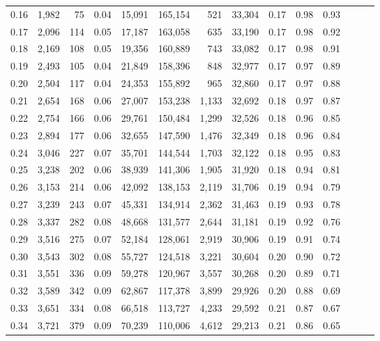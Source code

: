 \begin{tabular}{rrrrrrrrrrrrrr}
0.16 &  1,982 &   75 &  0.04 &   15,091 &  165,154 &     521 &  33,304 &  0.17 &  0.98 &      0.93 \\
0.17 &  2,096 &  114 &  0.05 &   17,187 &  163,058 &     635 &  33,190 &  0.17 &  0.98 &      0.92 \\
0.18 &  2,169 &  108 &  0.05 &   19,356 &  160,889 &     743 &  33,082 &  0.17 &  0.98 &      0.91 \\
0.19 &  2,493 &  105 &  0.04 &   21,849 &  158,396 &     848 &  32,977 &  0.17 &  0.97 &      0.89 \\
0.20 &  2,504 &  117 &  0.04 &   24,353 &  155,892 &     965 &  32,860 &  0.17 &  0.97 &      0.88 \\
0.21 &  2,654 &  168 &  0.06 &   27,007 &  153,238 &   1,133 &  32,692 &  0.18 &  0.97 &      0.87 \\
0.22 &  2,754 &  166 &  0.06 &   29,761 &  150,484 &   1,299 &  32,526 &  0.18 &  0.96 &      0.85 \\
0.23 &  2,894 &  177 &  0.06 &   32,655 &  147,590 &   1,476 &  32,349 &  0.18 &  0.96 &      0.84 \\
0.24 &  3,046 &  227 &  0.07 &   35,701 &  144,544 &   1,703 &  32,122 &  0.18 &  0.95 &      0.83 \\
0.25 &  3,238 &  202 &  0.06 &   38,939 &  141,306 &   1,905 &  31,920 &  0.18 &  0.94 &      0.81 \\
0.26 &  3,153 &  214 &  0.06 &   42,092 &  138,153 &   2,119 &  31,706 &  0.19 &  0.94 &      0.79 \\
0.27 &  3,239 &  243 &  0.07 &   45,331 &  134,914 &   2,362 &  31,463 &  0.19 &  0.93 &      0.78 \\
0.28 &  3,337 &  282 &  0.08 &   48,668 &  131,577 &   2,644 &  31,181 &  0.19 &  0.92 &      0.76 \\
0.29 &  3,516 &  275 &  0.07 &   52,184 &  128,061 &   2,919 &  30,906 &  0.19 &  0.91 &      0.74 \\
0.30 &  3,543 &  302 &  0.08 &   55,727 &  124,518 &   3,221 &  30,604 &  0.20 &  0.90 &      0.72 \\
0.31 &  3,551 &  336 &  0.09 &   59,278 &  120,967 &   3,557 &  30,268 &  0.20 &  0.89 &      0.71 \\
0.32 &  3,589 &  342 &  0.09 &   62,867 &  117,378 &   3,899 &  29,926 &  0.20 &  0.88 &      0.69 \\
0.33 &  3,651 &  334 &  0.08 &   66,518 &  113,727 &   4,233 &  29,592 &  0.21 &  0.87 &      0.67 \\
0.34 &  3,721 &  379 &  0.09 &   70,239 &  110,006 &   4,612 &  29,213 &  0.21 &  0.86 &      0.65 \\

\end{tabular}
